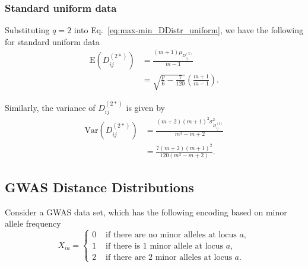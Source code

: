 \documentclass[10pt,letterpaper]{article}\usepackage[]{graphicx}\usepackage[]{color}
\begin{document}
\subsubsection{Standard uniform data}

Substituting $q=2$ into Eq.~\ref{eq:max-min_DDistr_uniform}, we have the following for standard uniform data
%
\begin{equation}
\begin{aligned}
\text{E}\left(D^{(2*)}_{ij}\right) &= \frac{(m+1)\mu_{D^{(2)}_{ij}}}{m-1} \\
&= \sqrt{\frac{p}{6} - \frac{7}{120}}\left(\frac{m+1}{m-1}\right).
\end{aligned}
\end{equation}

Similarly, the variance of $D^{(2*)}_{ij}$ is given by
%
\begin{equation}
\begin{aligned}
\text{Var}\left(D^{(2*)}_{ij}\right) &= \frac{(m+2)(m+1)^2\sigma^2_{D^{(2)}_{ij}}}{m^3 - m + 2} \\
&= \frac{7(m+2)(m+1)^2}{120(m^3 - m + 2)}.
\end{aligned}
\end{equation}

\subsection{GWAS Distance Distributions}

Consider a GWAS data set, which has the following encoding based on minor allele frequency
%
\begin{equation}\label{eq:gwas_data}
X_{ia} = \begin{cases}
0 & \text{ if there are no minor alleles at locus } a,  \\
1 & \text{ if there is 1 minor allele at locus } a, \\
2 & \text{ if there are 2 minor alleles at locus } a.
\end{cases}
\end{equation}
\end{document}
